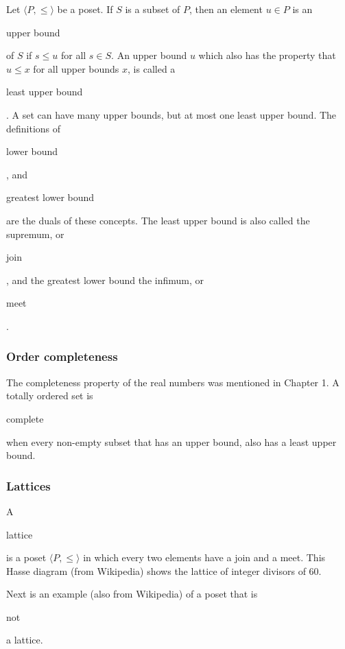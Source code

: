 \documentclass[11pt]{article}
\theoremstyle{plain}
\theoremstyle{definition}
\begin{document}
\noindent Let $ \langle P, \le \rangle $ be a poset.
If $ S $ is a subset of $ P $, then an element $ u \in P $ is an \begin{em}upper bound\end{em} of $ S $ if $ s \le u $ for all $ s \in S $.
An upper bound $ u $ which also has the property that $ u \le x $ for all upper bounds $ x $, is called a \begin{em}least upper bound\end{em}.
A set can have many upper bounds, but at most one least upper bound.
The definitions of \begin{em}lower bound\end{em}, and \begin{em}greatest lower bound\end{em} are the duals of these concepts.
The least upper bound is also called the supremum, or \begin{em}join\end{em}, and the greatest lower bound the infimum, or \begin{em}meet\end{em}.

\subsubsection*{Order completeness}

The completeness property of the real numbers was mentioned in Chapter 1.
A totally ordered set is \begin{em}complete\end{em} when every non-empty subset that has an upper bound, also has a least upper bound.

\subsubsection*{Lattices}

A \begin{em}lattice\end{em} is a poset $ \langle P, \le \rangle $ in which every two elements have a join and a meet.
This Hasse diagram (from Wikipedia) shows the lattice of integer divisors of $ 60 $.

\begin{center}
  \def\svgwidth{0.4\columnwidth}
  
\end{center}

\noindent Next is an example (also from Wikipedia) of a poset that is \begin{em}not\end{em} a lattice.
\end{document}
